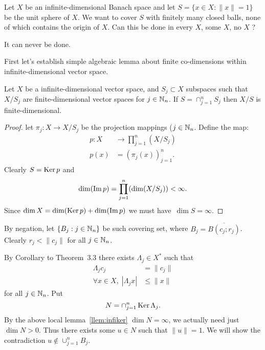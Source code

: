 \begin{enumerate}
\begin{excopy}
Let $X$ be an infinite-dimensional Banach space and let
\(S = \{x \in X: \|x\| = 1\}\) be the unit sphere of $X$. We want to cover $S$
with finitely many closed balls, none of which contains the origin of $X$.
Can this be done in  every $X$,  some $X$,   no $X$ ?
\end{excopy}

It can never be done.

First let's establish simple algebraic lemma about finite co-dimensions
within infinite-dimensional vector space.

\begin{llem} \label{llem:infiker}
Let $X$ be a infinite-dimensional vector space, and \(S_j \subset X\)
subspaces such that \(X/S_j\) are finite-dimensional vector spaces
for \(j\in\mathbb{N}_n\). If \(S = \cap_{j=1}^n S_j\) then \(X/S\) is finite-dimensional.
\end{llem}
\begin{proof}
let \(\pi_j : X \to X/S_j\) be the projection mappings (\(j\in\mathbb{N}_n\).
Define the map:
\begin{align*}
p: X &\to \prod_{j=1}^n (X/S_j) \\
p(x) &= (\pi_j(x))_{j=1}^n.
\end{align*}
Clearly \(S = \mathop{\rm Ker}\nolimits p\)
 and
\begin{equation*}
\dim(\mathop{\rm Im}\nolimits p) = \prod_{j=1}^n(\dim(X/S_j)) < \infty.
\end{equation*}
Since \(\dim X = \dim(\mathop{\rm Ker}\nolimits p) + \dim(\mathop{\rm Im}\nolimits p)\)
we must have \(\,\dim S = \infty\).
\end{proof}

By negation, let \(\{B_j: j\in\mathbb{N}_n\}\) be such covering set, 
where \(B_j = \overline{B(c_j;r_j)}\).
Clearly \(r_j < \|c_j\|\) for all \(j\in\mathbb{N}_n\).

By Corollary to Theorem~3.3 there exists \(\Lambda_j \in X^*\) 
such that 
\begin{align*}
\Lambda_j c_j &= \|c_j\| \\
\forall x\in X,\; |\Lambda_j x| &\leq \|x\|
\end{align*}
for all \(j\in\mathbb{N}_n\).  Put
\begin{equation*}
N = \cap_{j=1}^n \mathop{\rm Ker}\nolimits \Lambda_j.
\end{equation*}
By the above local lemma~\ref{llem:infiker} \(\dim N = \infty\),
we actually need just \(\dim N > 0\).
Thus there exists some \(u \in N\) such that \(\|u\| = 1\).
We will show the contradiction \(u \notin \cup_{j=1}^n B_j \).


\end{enumerate}
